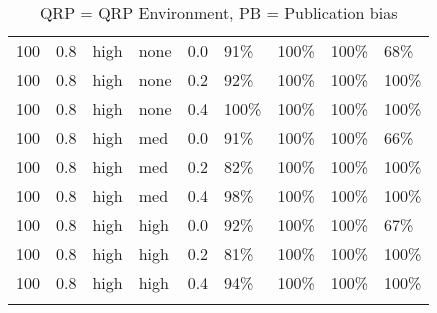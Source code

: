 \begin{longtable}{rrllrllll}
  100 & 0.8 & high & none & 0.0 & 91\% & 100\% & 100\% & 68\% \\ 
  100 & 0.8 & high & none & 0.2 & 92\% & 100\% & 100\% & 100\% \\ 
  100 & 0.8 & high & none & 0.4 & 100\% & 100\% & 100\% & 100\% \\ 
  100 & 0.8 & high & med & 0.0 & 91\% & 100\% & 100\% & 66\% \\ 
  100 & 0.8 & high & med & 0.2 & 82\% & 100\% & 100\% & 100\% \\ 
  100 & 0.8 & high & med & 0.4 & 98\% & 100\% & 100\% & 100\% \\ 
  100 & 0.8 & high & high & 0.0 & 92\% & 100\% & 100\% & 67\% \\ 
  100 & 0.8 & high & high & 0.2 & 81\% & 100\% & 100\% & 100\% \\ 
  100 & 0.8 & high & high & 0.4 & 94\% & 100\% & 100\% & 100\% \\ 
   \hline
\hline
\caption{QRP = QRP Environment, PB = Publication bias} 
\label{tab:convRate}
\end{longtable}
